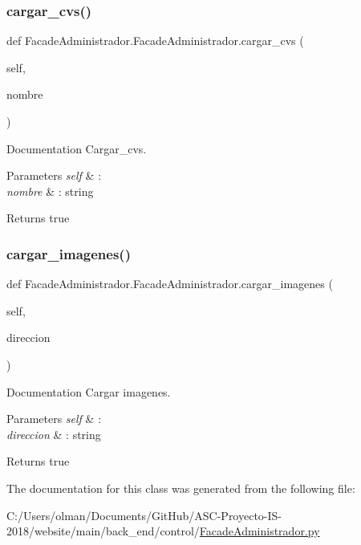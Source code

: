 \subsubsection{\texorpdfstring{cargar\+\_\+cvs()}{cargar\_cvs()}}
{\footnotesize\ttfamily def Facade\+Administrador.\+Facade\+Administrador.\+cargar\+\_\+cvs (\begin{DoxyParamCaption}\item[{}]{self,  }\item[{}]{nombre }\end{DoxyParamCaption})}



Documentation Cargar\+\_\+cvs. 


\begin{DoxyParams}{Parameters}
{\em self} & \+: \\
\hline
{\em nombre} & \+: string \\
\hline
\end{DoxyParams}
\begin{DoxyReturn}{Returns}
true 
\end{DoxyReturn}
\mbox{\label{class_facade_administrador_1_1_facade_administrador_aca7528cedb162799ab858010207a5dab}} 
\subsubsection{\texorpdfstring{cargar\+\_\+imagenes()}{cargar\_imagenes()}}
{\footnotesize\ttfamily def Facade\+Administrador.\+Facade\+Administrador.\+cargar\+\_\+imagenes (\begin{DoxyParamCaption}\item[{}]{self,  }\item[{}]{direccion }\end{DoxyParamCaption})}



Documentation Cargar imagenes. 


\begin{DoxyParams}{Parameters}
{\em self} & \+: \\
\hline
{\em direccion} & \+: string \\
\hline
\end{DoxyParams}
\begin{DoxyReturn}{Returns}
true 
\end{DoxyReturn}


The documentation for this class was generated from the following file\+:\begin{DoxyCompactItemize}
\item 
C\+:/\+Users/olman/\+Documents/\+Git\+Hub/\+A\+S\+C-\/\+Proyecto-\/\+I\+S-\/2018/website/main/back\+\_\+end/control/\mbox{\hyperlink{_facade_administrador_8py}{Facade\+Administrador.\+py}}\end{DoxyCompactItemize}
